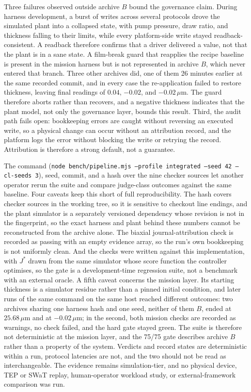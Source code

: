 Three failures observed outside archive $B$ bound the governance claim. During harness
development, a burst of writes across several protocols drove the simulated plant
into a collapsed state, with pump pressure, draw ratio, and thickness falling to
their limits, while every platform-side write stayed readback-consistent. A readback
therefore confirms that a driver delivered a value, not that the plant is in a sane
state. A film-break guard that reapplies the recipe baseline is present in the mission harness but is not represented in archive $B$, which never entered that branch. Three other archives did, one of them 26 minutes earlier at the same recorded commit, and in every case the re-application failed to restore thickness, leaving final readings of $0.04$, $-0.02$, and $-0.02\,\mu$m. The guard therefore aborts rather than recovers, and a negative thickness indicates that the plant model, not only the governance layer, bounds this result. Third, the audit path fails open: bookkeeping errors are caught without reversing an executed write,
so a physical change can occur without an attribution record, and the platform logs
the error without blocking the write or retrying the record. Attribution is
therefore a strong default, not a guarantee.

The command
(\texttt{node bench/pipeline.mjs --profile integrated --seed 42 --cl-seeds 3}),
seed, commit, and a hash over the nine checker sources let another operator rerun
the suite and compare judge-class outcomes against the same baseline. Four caveats
keep this short of full reproducibility. The hash covers checker sources in the
working tree, so it is sensitive to checkout line endings, and the plant simulator
is a separately versioned dependency whose revision is not in the fingerprint, so
the exact harness and plant behind these numbers cannot be reconstructed from the
archive alone. The biaxial journal-attribution check is recorded as passing with an
empty evidence array, so the run's own bookkeeping is not uniformly clean. And the
checks were written against this implementation, with $J^{*}$ drawn from the same
simulator whose score function the controller optimises, so the gate is a
development-time regression suite, not a benchmark with an external oracle. A fifth caveat concerns the mission layer. Its starting thickness is a simulator residue rather than a pinned initial condition, and later runs of the same command on the same host reached different outcomes: two archives sharing one harness hash and one seed, neither of them $B$, ended at $25.68\,\mu$m and at $-0.02\,\mu$m; in the second, both mission checks are recorded as warnings, no check failed, and the hard gate stayed green. The suite is therefore not deterministic at the mission layer, and the 75/75 gate describes archive $B$ rather than a property of the system. Verdicts and record states are deterministic within a run, protocol latencies are not, and the two should not be read as interchangeable. The evidence remains simulation-tier, and no
physical device, TEP or SWaT replay, human-operator workload study, or
external-framework comparison was run.

